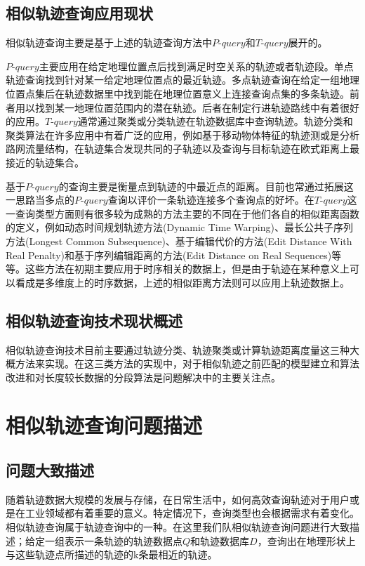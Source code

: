 \subsection{相似轨迹查询应用现状}
\label{subsec:searching trajectories application now}
相似轨迹查询主要是基于上述的轨迹查询方法中$P$-$query$和$T$-$query$展开的。

$P$-$query$主要应用在给定地理位置点后找到满足时空关系的轨迹或者轨迹段。单点轨迹查询找到针对某一给定地理位置点的最近轨迹。多点轨迹查询在给定一组地理位置点集后在轨迹数据里中找到能在地理位置意义上连接查询点集的多条轨迹。前者用以找到某一地理位置范围内的潜在轨迹。后者在制定行进轨迹路线中有着很好的应用。$T$-$query$通常通过聚类或分类轨迹在轨迹数据库中查询轨迹。轨迹分类和聚类算法在许多应用中有着广泛的应用，例如基于移动物体特征的轨迹测或是分析路网流量结构，在轨迹集合发现共同的子轨迹以及查询与目标轨迹在欧式距离上最接近的轨迹集合。

基于$P$-$query$的查询主要是衡量点到轨迹的中最近点的距离。目前也常通过拓展这一思路当多点的$P$-$query$查询以评价一条轨迹连接多个查询点的好坏。在$T$-$query$这一查询类型方面则有很多较为成熟的方法主要的不同在于他们各自的相似距离函数的定义，例如动态时间规划轨迹方法(Dynamic Time Warping)、最长公共子序列方法(Longest Common Subsequence)、基于编辑代价的方法(Edit Distance With Real Penalty)和基于序列编辑距离的方法(Edit Distance on Real Sequences)等等。这些方法在初期主要应用于时序相关的数据上，但是由于轨迹在某种意义上可以看成是多维度上的时序数据，上述的相似距离方法则可以应用上轨迹数据上。

\subsection{相似轨迹查询技术现状概述}
\label{subsec:searching trajectories technique now}
相似轨迹查询技术目前主要通过轨迹分类、轨迹聚类或计算轨迹距离度量这三种大概方法来实现。在这三类方法的实现中，对于相似轨迹之前匹配的模型建立和算法改进和对长度较长数据的分段算法是问题解决中的主要关注点。

\section{相似轨迹查询问题描述}
\label{sec:requirements}
\subsection{问题大致描述}
\label{subsec:question}
随着轨迹数据大规模的发展与存储，在日常生活中，如何高效查询轨迹对于用户或是在工业领域都有着重要的意义。特定情况下，查询类型也会根据需求有着变化。相似轨迹查询属于轨迹查询中的一种。在这里我们队相似轨迹查询问题进行大致描述；给定一组表示一条轨迹的轨迹数据点$Q$和轨迹数据库$D$，查询出在地理形状上与这些轨迹点所描述的轨迹的k条最相近的轨迹。

